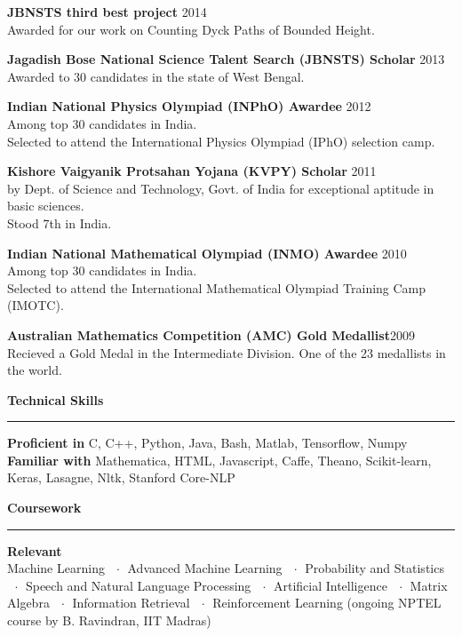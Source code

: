 \documentclass[10pt]{article}
\newcommand{\heading}[1]{
 {\large \textbf{#1}}
  \vspace{0.4em}
  \hrule
  \vspace{0.4em}
}
\newcommand{\EntryGap}{\vspace{0.5cm}}
\newcommand{\SmallEntryGap}{\vspace{0.2cm}}
\newcommand{\mdot}{$\ \ \cdot\ \ $}
\begin{document}
 \textbf{JBNSTS third best project} \hfill 2014\\
  Awarded for our work on Counting Dyck Paths of Bounded Height.
  \SmallEntryGap
  
 \textbf{Jagadish Bose National Science Talent Search (JBNSTS) Scholar} \hfill 2013\\
  Awarded to 30 candidates in the state of West Bengal.
  \SmallEntryGap
  
 \textbf{Indian National Physics Olympiad (INPhO) Awardee} \hfill 2012\\
  Among top 30 candidates in India.\\
  Selected to attend the 
  International Physics Olympiad (IPhO) selection camp.
  \SmallEntryGap
  
 \textbf{Kishore Vaigyanik Protsahan Yojana (KVPY) Scholar} \hfill 2011\\
  by Dept. of Science and Technology, Govt. of India for exceptional aptitude in basic sciences.\\
  Stood 7th in India.
  \SmallEntryGap
  
 \textbf{Indian National Mathematical Olympiad (INMO) Awardee} \hfill 2010\\
  Among top 30 candidates in India.\\
  Selected to attend the International Mathematical Olympiad Training Camp (IMOTC).
  \SmallEntryGap
  
 \textbf{Australian Mathematics Competition (AMC) Gold Medallist}\hfill 2009\\
  Recieved a Gold Medal in the Intermediate Division. One of the 23 medallists in the world.




\EntryGap
\heading{Technical Skills}
\SmallEntryGap
\textbf{Proficient in} C, C++, Python, Java, Bash, Matlab, Tensorflow, Numpy\\
\textbf{Familiar with} Mathematica, HTML, Javascript, Caffe, Theano, Scikit-learn,\\
Keras, Lasagne, Nltk, Stanford Core-NLP





\EntryGap
\heading{Coursework}

\textbf{Relevant}\\
Machine Learning \mdot Advanced Machine Learning \mdot Probability and Statistics 
\mdot Speech and Natural Language Processing \mdot Artificial Intelligence 
\mdot Matrix Algebra \mdot Information Retrieval \mdot Reinforcement Learning
(ongoing NPTEL course by B. Ravindran, IIT Madras)
\end{document}
